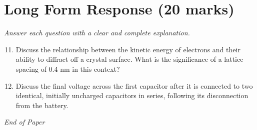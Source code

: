 \documentclass[12pt]{article}
\begin{document}
\section*{Long Form Response (20 marks)}
\textit{Answer each question with a clear and complete explanation.}
\begin{enumerate}[label=\arabic*.]
\setcounter{enumi}{10}
\item Discuss the relationship between the kinetic energy of electrons and their ability to diffract off a crystal surface. What is the significance of a lattice spacing of 0.4 nm in this context?
\item Discuss the final voltage across the first capacitor after it is connected to two identical, initially uncharged capacitors in series, following its disconnection from the battery.
\end{enumerate}

\vfill
\noindent\textit{End of Paper}
\end{document}
